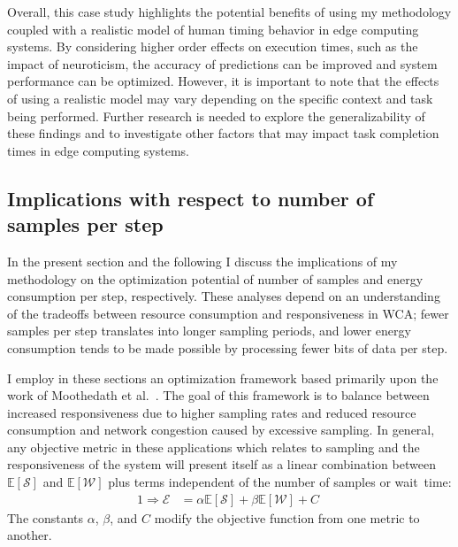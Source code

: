 Overall, this case study highlights the potential benefits of using my methodology coupled with a realistic model of human timing behavior in edge computing systems.
By considering higher order effects on execution times, such as the impact of neuroticism, the accuracy of predictions can be improved and system performance can be optimized.
However, it is important to note that the effects of using a realistic model may vary depending on the specific context and task being performed.
Further research is needed to explore the generalizability of these findings and to investigate other factors that may impact task completion times in edge computing systems.

\subsection{Implications with respect to number of samples per step}

In the present section and the following I discuss the implications of my methodology on the optimization potential of number of samples and energy consumption per step, respectively.
These analyses depend on an understanding of the tradeoffs between resource consumption and responsiveness in \gls{WCA};
fewer samples per step translates into longer sampling periods, and lower energy consumption tends to be made possible by processing fewer bits of data per step.

I employ in these sections an optimization framework based primarily upon the work of Moothedath et al.~\cite{moothedath2021energy,moothedath2022energy1,moothedath2022energy2}.
The goal of this framework is to balance between increased responsiveness due to higher sampling rates and reduced resource consumption and network congestion caused by excessive sampling.
In general, any objective metric in these applications which relates to sampling and the responsiveness of the system will present itself
as a linear combination between \ensuremath{\mathbb{E}[\mathcal{S}]} and \ensuremath{\mathbb{E}[\mathcal{W}]} plus terms independent of the number of samples or wait~time:
\begin{alignat}{1}\label{eq:tradeoff}
    \Rightarrow\mathcal{E}&=\alpha\mathbb{E}[\mathcal{S}]+\beta\mathbb{E}[\mathcal{W}]+C\;
\end{alignat}
The constants \ensuremath{\alpha}, \ensuremath{\beta}, and \ensuremath{C} modify the objective function from one metric to another.

